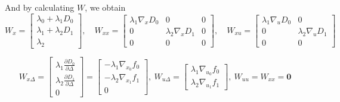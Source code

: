 \documentclass{article}
\begin{document}
And by calculating $W$, we obtain
\[
W_{x} = \left[\begin{matrix} \lambda_0 +\lambda_1D_0 \\ \lambda_1+\lambda_2D_1 \\ \lambda_2 \end{matrix}\right]  ,\quad 
W_{xx} = \left[\begin{matrix} \lambda_1\nabla_xD_0&0&0\\0 &\lambda_2\nabla_xD_1&0\\0&0&0\end{matrix}\right],\quad W_{xu} = \left[ \begin{matrix} \lambda_1\nabla_uD_0&0\\0&\lambda_2\nabla_uD_1 \\ 0&0\end{matrix}\right]
\]

\[
W_{x\Delta}=\left[\begin{matrix}\lambda_1 \frac{\partial D_0}{\partial \Delta}\\ \lambda_2 \frac{\partial D_1}{\partial\Delta} \\ 0 \end{matrix}\right]
=\left[\begin{matrix}-\lambda_1\nabla_{x_0}f_0 \\ -\lambda_2\nabla_{x_1}f_1 \\ 0 \end{matrix}\right],\ W_{u\Delta}=\left[\begin{matrix}\lambda_1 \nabla_{u_0}f_0\\ \lambda_2 \nabla_{u_1}f_1\end{matrix}\right] 
,\ W_{uu} = W_{xx} = \mathbf{0}
\]
\end{document}
